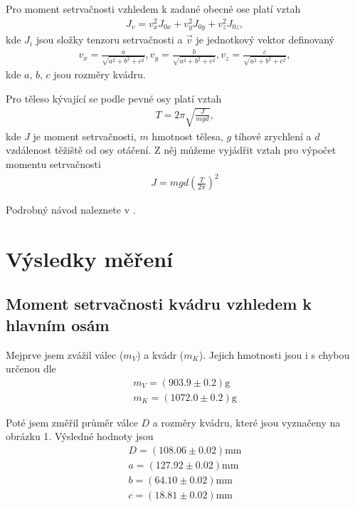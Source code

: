 \documentclass[a4paper,12pt]{article}
\begin{document}
Pro moment setrvačnosti vzhledem k zadané obecné ose platí vztah
\begin{eqnarray}
	J_v=v_x^2J_{0x}+v_y^2J_{0y}+v_z^2J_{0z},
\end{eqnarray}
kde $J_i$ jsou složky tenzoru setrvačnosti a $\vec v$ je jednotkový vektor definovaný 
\begin{eqnarray}
v_x=\frac{a}{\sqrt{a^2+b^2+c^2}},v_y=\frac{b}{\sqrt{a^2+b^2+c^2}},v_z=\frac{c}{\sqrt{a^2+b^2+c^2}},
\end{eqnarray}
kde $a$, $b$, $c$ jsou rozměry kvádru.

Pro těleso kývající se podle pevné osy platí vztah
\begin{eqnarray}
	T=2\pi\sqrt{\frac{J}{mgd}},
\end{eqnarray}
kde $J$ je moment setrvačnosti, $m$ hmotnost tělesa, $g$ tíhové zrychlení a $d$ 
vzdálenost těžiště od osy otáčení. Z něj můžeme vyjádřit vztah pro výpočet 
momentu setrvačnosti
\begin{eqnarray}
	J=mgd\left(\frac{T}{2\pi}\right)^2
\end{eqnarray}

Podrobný návod naleznete v \cite{text}.

\section{Výsledky měření}
\subsection{Moment setrvačnosti kvádru vzhledem k hlavním osám}
Mejprve jsem zvážil válec ($m_V$) a kvádr ($m_K$). Jejich hmotnosti jsou i s chybou 
určenou dle \cite{chyba}
\begin{eqnarray}
	m_V=(903.9\pm0.2)\mbox{g} \\
	m_K=(1072.0\pm0.2)\mbox{g} 
\end{eqnarray}

Poté jsem změřil průměr válce $D$ a rozměry kvádru, které jsou vyznačeny na obrázku 1. 
Výsledné hodnoty jsou
\begin{eqnarray}
	D=(108.06\pm0.02)\mbox{mm} \\
	a=(127.92\pm0.02)\mbox{mm} \\	
	b=(64.10\pm0.02)\mbox{mm} \\
	c=(18.81\pm0.02)\mbox{mm}
\end{eqnarray}
\end{document}
